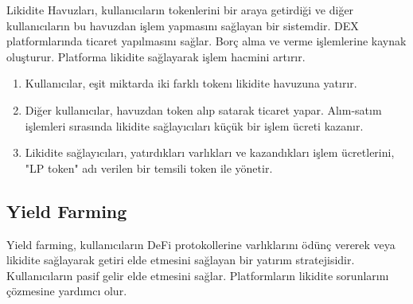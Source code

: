 Likidite Havuzları, kullanıcıların tokenlerini bir araya getirdiği ve diğer kullanıcıların bu havuzdan işlem yapmasını sağlayan bir sistemdir. DEX platformlarında ticaret yapılmasını sağlar. Borç alma ve verme işlemlerine kaynak oluşturur. Platforma likidite sağlayarak işlem hacmini artırır.

\begin{enumerate}
    \item Kullanıcılar, eşit miktarda iki farklı tokenı likidite havuzuna yatırır.
    \item Diğer kullanıcılar, havuzdan token alıp satarak ticaret yapar. Alım-satım işlemleri sırasında likidite sağlayıcıları küçük bir işlem ücreti kazanır.
    \item Likidite sağlayıcıları, yatırdıkları varlıkları ve kazandıkları işlem ücretlerini, "LP token" adı verilen bir temsili token ile yönetir.
\end{enumerate}

\subsection{Yield Farming}

Yield farming, kullanıcıların DeFi protokollerine varlıklarını ödünç vererek veya likidite sağlayarak getiri elde etmesini sağlayan bir yatırım stratejisidir. Kullanıcıların pasif gelir elde etmesini sağlar. Platformların likidite sorunlarını çözmesine yardımcı olur.

\newpage